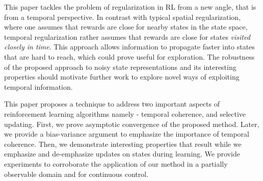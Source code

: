 This paper tackles the problem of regularization in RL from a new angle, that is from a temporal perspective. In contrast with typical spatial regularization, where one assumes that rewards are close for nearby states in the state space, temporal regularization rather assumes that rewards are close for states \emph{visited closely in time}. This approach allows information to propagate faster into states that are hard to reach, which could prove useful for exploration. The robustness of the proposed approach to noisy state representations and its interesting properties should motivate further work to explore novel ways of exploiting temporal information.

This paper proposes a technique to address two important aspects of reinforcement learning algorithms namely - temporal coherence, and selective updating. First, we prove asymptotic convergence of the proposed method. Later, we provide a bias-variance argument to emphasize the importance of temporal coherence. Then, we demonstrate interesting properties that result while we emphasize and de-emphasize updates on states during learning. We provide experiments to corroborate the application of our method in a partially observable domain and for continuous control.